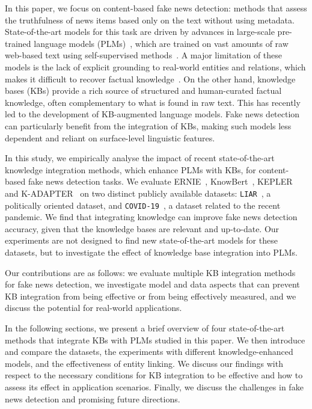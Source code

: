 \documentclass[letterpaper]{article} %
\begin{document}
In this paper, we focus on content-based fake news detection: methods that assess the truthfulness of news items based only on the text without using metadata. 
State-of-the-art models for this task are driven by advances in 
large-scale pre-trained language models (PLMs)~\citep[e.g.][]{Liu2019ATM, Kaliyar2021FakeBERT}, which are trained on vast amounts of raw web-based text using self-supervised methods~\cite{rogers-etal-2020-primer}.  
A major limitation of these models is the lack of explicit grounding to real-world entities and relations, which makes it difficult to recover factual knowledge~\cite{Bender2021OnTD}. 
On the other hand, knowledge bases (KBs) provide a rich source of structured and human-curated factual knowledge, often complementary to what is found in raw text. 
This has recently led to the development of KB-augmented language models. 
Fake news detection can particularly benefit from the integration of KBs, making such models less dependent and reliant on surface-level linguistic features. 

In this study, we empirically analyse the impact of recent state-of-the-art knowledge integration methods, which enhance PLMs with KBs, for content-based fake news detection tasks. 
We evaluate ERNIE~\cite{zhang-etal-2019-ernie},  KnowBert~\cite{peters-etal-2019-knowledge}, KEPLER~\cite{kepler} and K-ADAPTER~\cite{wang-etal-2021-k} on two distinct publicly available datasets:  \texttt{LIAR}~\cite{wang-2017-liar}, a politically oriented dataset, and \texttt{COVID-19}~\cite{Patwa2021FightingAI}, a dataset related to the recent pandemic. 
We find that integrating knowledge can improve fake news detection accuracy, given that the knowledge bases are relevant and up-to-date.
Our experiments are not designed to find new state-of-the-art models for these datasets, but to investigate the effect of knowledge base integration into PLMs. 

Our contributions are as follows: we evaluate multiple KB integration methods for fake news detection, we investigate model and data  aspects that can prevent KB integration from being effective or from being effectively measured, and we discuss the potential for real-world applications.

In the following sections, we present a brief overview of four state-of-the-art methods that integrate KBs with PLMs studied in this paper.
We then introduce and compare the datasets, the experiments with different knowledge-enhanced models, and the effectiveness of entity linking.
We discuss our findings with respect to the necessary conditions for KB integration to be effective and how to assess its effect in application scenarios.  
Finally, we discuss the challenges in fake news detection and promising future directions.
\end{document}
